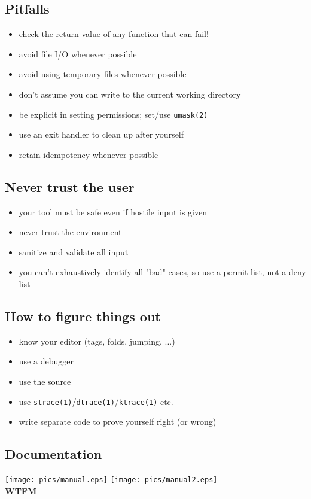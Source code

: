 \documentclass[xga]{xdvislides}
\begin{document}
\subsection{Pitfalls}
\begin{itemize}
	\item check the return value of any function that can fail!
	\item avoid file I/O whenever possible
	\item avoid using temporary files whenever possible
	\item don't assume you can write to the current working directory
	\item be explicit in setting permissions; set/use \verb+umask(2)+
	\item use an exit handler to clean up after yourself
	\item retain idempotency whenever possible
\end{itemize}

\subsection{Never trust the user}
\begin{itemize}
	\item your tool must be safe even if hostile input is given
	\item never trust the environment
	\item sanitize and validate all input
	\item you can't exhaustively identify all "bad" cases, so use a permit list, not a deny list
\end{itemize}

\subsection{How to figure things out}
\begin{itemize}
	\item know your editor (tags, folds, jumping, ...)
	\item use a debugger
	\item use the source
	\item use \verb+strace(1)+/\verb+dtrace(1)+/\verb+ktrace(1)+ etc.
	\item write separate code to prove yourself right (or wrong)
\end{itemize}

\subsection{Documentation}
\vspace*{\fill}
\begin{center}
	\texttt{[image: pics/manual.eps]}
	\hspace{.5in}
	\texttt{[image: pics/manual2.eps]}
	\\
	\vspace{.2in}
	\Huge
	{\bf WTFM}
	\Normalsize
\end{center}
\vspace*{\fill}
\end{document}
